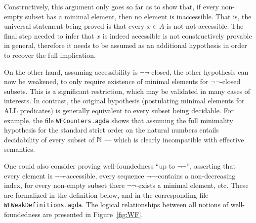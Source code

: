 Constructively, this argument only goes so far as to show that, if every non-empty
subset has a minimal element, then no element is inaccessible.
That is, the universal statement being proved is that every $x \in A$
is not-not-accessible. The final step needed to infer that $x$ is indeed accessible
is not constructively provable in general, therefore it needs to be assumed as
an additional hypothesis in order to recover the full implication.

On the other hand, assuming accessibility is $\lnot\lnot$-closed, the other
hypothesis can now be weakened, to only require existence of minimal elements
for $\lnot\lnot$-closed subsets.  This is a significant restriction, which may
be validated in many cases of interests.  In contrast, the original hypothesis
(postulating minimal elements for ALL predicates)
is generally equivalent to every subset being decidable.
For example, the file \texttt{WFCounters.agda} shows that assuming the full minimality hypothesis
for the standard strict order on the natural numbers entails decidability
of every subset of $\mathbb{N}$ --- which is clearly incompatible with effective semantics.

One could also consider proving well-foundedness ``up to $\lnot\lnot$'',
asserting that every element is $\lnot\lnot$-accessible,
every sequence $\lnot\lnot$-contains a non-decreasing index,
for every non-empty subset there $\lnot\lnot$-exists a minimal element, etc.
These are formalized in the definition below, and in the corresponding file
\texttt{WFWeakDefinitions.agda}. The logical relationships between all notions of well-foundedness are presented in Figure~\ref{fig:WF}.

